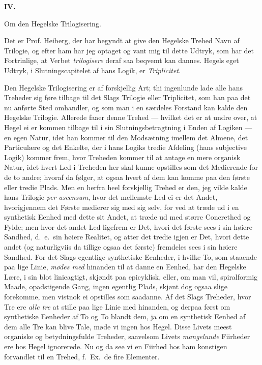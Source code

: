 \documentclass[12pt,a4paper]{book}
\newcommand{\apage}[1]{\marginnote{\footnotesize\textit{[#1]}}}
\begin{document}
%
\bigskip
\begin{center}
{\large\textbf{IV.}}

\medskip
Om den Hegelske Trilogisering.
\end{center}
\bigskip

Det er Prof. Heiberg, der har begyndt at give den Hegelske Trehed Navn af
Trilogie, og efter ham har jeg optaget og vant mig til dette Udtryk, som har
det Fortrinlige, at Verbet \emph{trilogisere} deraf saa beqvemt kan dannes. Hegels
eget Udtryk, i Slutningscapitelet af hans Logik, er \emph{Triplicitet}.

\apage{125} Den Hegelske Trilogisering er af forskjellig Art; thi ingenlunde lade alle hans
Treheder sig føre tilbage til det Slags Trilogie eller Triplicitet, som han paa
det nu anførte Sted omhandler, og som man i en særdeles Forstand kan kalde den
Hegelske Trilogie. Allerede faaer denne Trehed --- hvilket det er at undre
over, at Hegel ei er kommen tilbage til i sin Slutningsbetragtning i Enden af
Logiken --- en egen Natur, idet han kommer til den Modsætning imellem det
Almene, det Particulære og det Enkelte, der i hans Logiks tredie Afdeling (hans
subjective Logik) kommer frem, hvor Treheden kommer til at antage en mere
organisk Natur, idet hvert Led i Treheden her skal kunne opstilles som det
Medierende for de to andre; hvoraf da følger, at ogsaa hvert af dem kan komme
paa den første eller tredie Plads. Men en herfra heel forskjellig Trehed er
den, jeg vilde kalde hans Trilogie \textit{per ascensum}, hvor det mellemste
Led ei er det Andet, hvorigjennem det Første medierer sig med sig selv, for ved
at træde ud i en synthetisk Eenhed med dette sit Andet, at træde ud med større
Concrethed og Fylde; men hvor det andet Led ligefrem er Det, hvori det første
sees i sin høiere Sandhed, d.\ e.\ sin høiere Realitet, og atter det tredie
igjen er Det, hvori dette andet (og naturligviis da tillige ogsaa det første)
fremdeles sees i sin høiere Sandhed. For det Slags egentlige synthetiske
Eenheder, i hvilke To, som staaende paa lige Linie, \emph{mødes med} hinanden til at
danne en Eenhed, har den Hegelske Lære, i sin blot linieagtigt, skjøndt paa
epicyklisk, eller, om man vil, spiralformig Maade, opadstigende Gang, ingen
egentlig Plads, skjønt dog ogsaa slige forekomme, men vistnok ei opstilles som
saadanne. Af det Slags Treheder, hvor Tre ere \emph{alle tre} at stille paa lige Linie
med hinanden, og derpaa først om synthetiske Eenheder af To og To blandt dem,
ja om en synthetisk Eenhed af dem alle Tre kan blive Tale, møde vi ingen hos
Hegel. Disse Livets meest organiske og betydningsfulde Treheder, saavelsom
Livets \emph{mangelunde} \apage{126} Fiirheder ere hos Hegel ignorerede. Nu og da see vi en
Fiirhed hos ham konstigen forvandlet til en Trehed, f.\ Ex.\ de fire Elementer.
\end{document}
